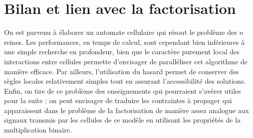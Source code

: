 



\section{Bilan et lien avec la factorisation}



On est parvenu à élaborer un automate cellulaire qui résout le problème des $n$ reines. Les performances, en temps de calcul, sont cependant  bien inférieures à une simple recherche en profondeur, bien que le caractère purement local des interactions entre cellules permette d'envisager de paralléliser cet algorithme de manière efficace. Par ailleurs, l'utilisation du hasard permet de conserver des règles locales relativement simples tout en assurant l'accessibilité des solutions. Enfin, on tire de ce problème des enseignements qui pourraient s'avérer utiles pour la suite : on peut envisager de traduire les con\-train\-tes à propager qui apparaissent dans le problème de la factorisation de manière assez analogue aux signaux transmis par les cellules de ce modèle en utilisant les propriétés de la multiplication binaire.

